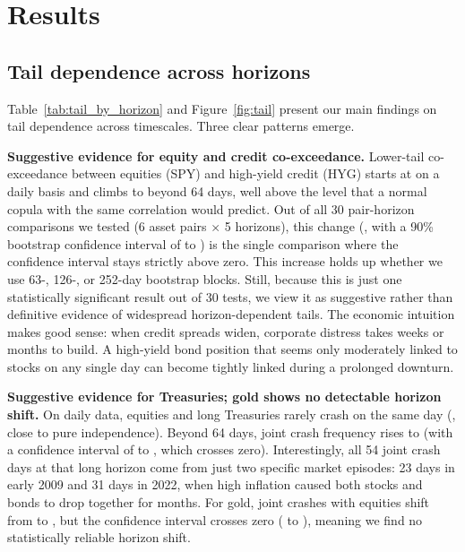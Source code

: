 \documentclass[11pt,a4paper]{article}
\begin{document}
\section{Results}
\label{sec:results}

\subsection{Tail dependence across horizons}

Table~\ref{tab:tail_by_horizon} and Figure~\ref{fig:tail} present our main findings on tail dependence across timescales. Three clear patterns emerge.

\textbf{Suggestive evidence for equity and credit co-exceedance.} Lower-tail co-exceedance between equities (SPY) and high-yield credit (HYG) starts at \SpyHygDaily{} on a daily basis and climbs to \SpyHygLong{} beyond 64 days, well above the \SpyHygGaussLong{} level that a normal copula with the same correlation would predict. Out of all 30 pair-horizon comparisons we tested (6 asset pairs $\times$ 5 horizons), this change (\SpyHygChange{}, with a 90\% bootstrap confidence interval of \SpyHygChangeLow{} to \SpyHygChangeHigh{}) is the single comparison where the confidence interval stays strictly above zero. This increase holds up whether we use 63-, 126-, or 252-day bootstrap blocks. Still, because this is just one statistically significant result out of 30 tests, we view it as suggestive rather than definitive evidence of widespread horizon-dependent tails. The economic intuition makes good sense: when credit spreads widen, corporate distress takes weeks or months to build. A high-yield bond position that seems only moderately linked to stocks on any single day can become tightly linked during a prolonged downturn.

\textbf{Suggestive evidence for Treasuries; gold shows no detectable horizon shift.} On daily data, equities and long Treasuries rarely crash on the same day (\SpyTltDaily{}, close to pure independence). Beyond 64 days, joint crash frequency rises to \SpyTltLong{} (with a confidence interval of \SpyTltLongLow{} to \SpyTltLongHigh{}, which crosses zero). Interestingly, all 54 joint crash days at that long horizon come from just two specific market episodes: 23 days in early 2009 and 31 days in 2022, when high inflation caused both stocks and bonds to drop together for months. For gold, joint crashes with equities shift from \SpyGldDaily{} to \SpyGldLong{}, but the confidence interval crosses zero (\SpyGldChangeLow{} to \SpyGldChangeHigh{}), meaning we find no statistically reliable horizon shift.
\end{document}
